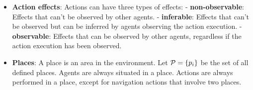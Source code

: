 \documentclass[letterpaper]{article} %
\begin{document}
\begin{itemize}

    \item \textbf{Action effects}: 
    Actions can have three types of effects: 
    \subitem - \textbf{non-observable}: Effects that can't be observed by other agents.
    \subitem - \textbf{inferable}: Effects that can't be observed but can be inferred by agents observing the action execution.
    \subitem - \textbf{observable}: Effects that can be observed by other agents, regardless if the action execution has been observed.
    
    \item \textbf{Places}: 
    A place is an area in the environment. Let $\mathcal{P}=\{ p_i \}$ be the set of all defined places. Agents are always situated in a place. Actions are always performed in a place, except for navigation actions that involve two places.

\end{itemize}    
\end{document}
